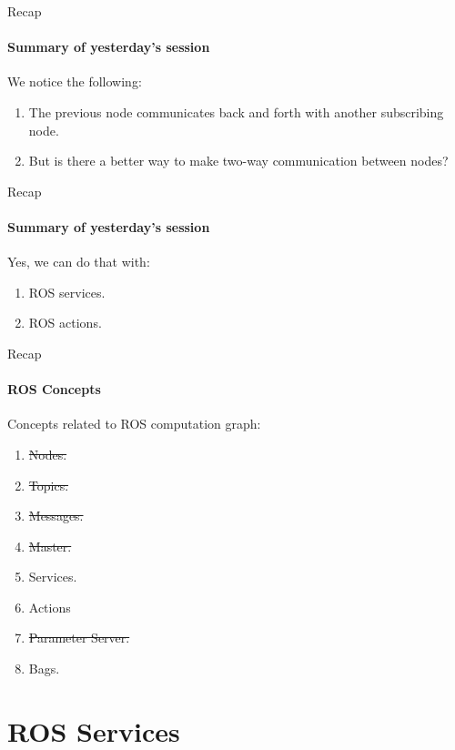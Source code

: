 \documentclass{beamer}
\begin{document}
\begin{frame}{Recap}
    \framesubtitle{Summary of yesterday’s session}
    
    We notice the following:
    \vspace{5mm}
    \begin{enumerate}      
        \item The previous node communicates back and forth with another subscribing node.
        \vspace{5mm}
        \item But is there a better way to make two-way communication between nodes?
    \end{enumerate}
\end{frame}

\begin{frame}{Recap}
    \framesubtitle{Summary of yesterday’s session}
    
    Yes, we can do that with:
    \vspace{5mm}
    \begin{enumerate}      
        \item ROS services.
        \vspace{5mm}
        \item ROS actions.
    \end{enumerate}
\end{frame}

\begin{frame}{Recap}
    \framesubtitle{ROS Concepts}
    
    Concepts related to ROS computation graph:
    
    \begin{enumerate}
        \item \sout{Nodes.}  \checkmark
        \item \sout{Topics.} \checkmark
        \item \sout{Messages.} \checkmark
        \item \sout{Master.} \checkmark
        \item Services.
        \item Actions
        \item \sout{Parameter Server.} \checkmark
        \item Bags.
    \end{enumerate}
\end{frame}

\section{ROS Services}
\end{document}

